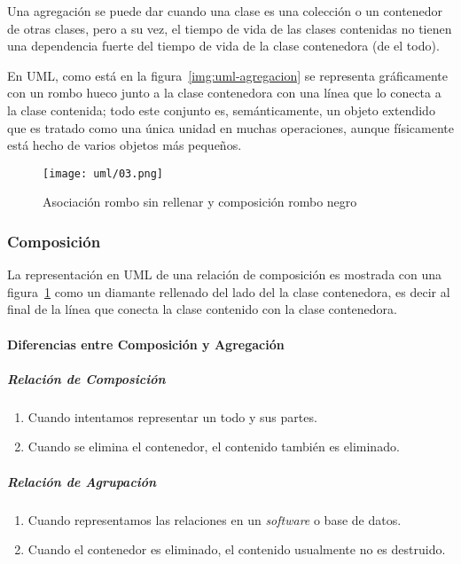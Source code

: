 Una agregación se puede dar cuando una clase es una colección o un contenedor de otras clases, pero a su vez, el tiempo de vida de las clases contenidas no tienen una dependencia fuerte del tiempo de vida de la clase contenedora (de el todo). 


En UML, como está en la figura~\ref{img:uml-agregacion} se representa gráficamente con un rombo hueco junto a la clase contenedora con una línea que lo conecta a la clase contenida; todo este conjunto es, semánticamente, un objeto extendido que es tratado como una única unidad en muchas operaciones, aunque físicamente está hecho de varios objetos más pequeños.

\begin{figure}[H] 
    \centering
    \texttt{[image: uml/03.png]}
    \caption{Asociación rombo sin rellenar y composición rombo negro}
    \label{img:uml-composicion}
\end{figure}

\subsubsection*{Composición}

La representación en UML de una relación de composición es mostrada con una figura~\ref{img:uml-composicion} como un diamante rellenado del lado del la clase contenedora, es decir al final de la línea que conecta la clase contenido con la clase contenedora.


\paragraph*{Diferencias entre Composición y Agregación}

\subparagraph*{Relación de Composición}

\begin{enumerate}
    \item Cuando intentamos representar un todo y sus partes.
    \item Cuando se elimina el contenedor, el contenido también es eliminado.
\end{enumerate}


\subparagraph*{Relación de Agrupación}

\begin{enumerate}
    \item Cuando representamos las relaciones en un \textit{software} o base de datos. 
    \item Cuando el contenedor es eliminado, el contenido usualmente no es destruido.
\end{enumerate}